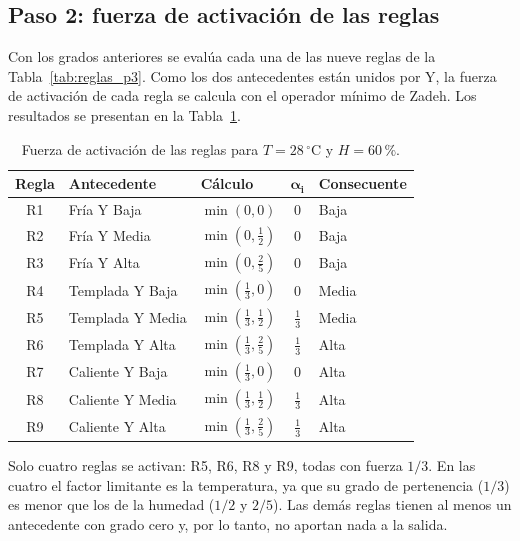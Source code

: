 \documentclass[11pt]{article}
\begin{document}
\subsection{Paso 2: fuerza de activación de las reglas}

Con los grados anteriores se evalúa cada una de las nueve reglas de la Tabla~\ref{tab:reglas_p3}. Como los dos antecedentes están unidos por Y, la fuerza de activación de cada regla se calcula con el operador mínimo de Zadeh. Los resultados se presentan en la Tabla~\ref{tab:activacion}.

\begin{table}[htbp]
\centering
\caption{Fuerza de activación de las reglas para $T = 28\,^\circ$C y $H = 60\,\%$.}
\label{tab:activacion}
\begin{tabular}{cllcl}
\toprule
\textbf{Regla} & \textbf{Antecedente} & \textbf{Cálculo} & $\boldsymbol{\alpha_i}$ & \textbf{Consecuente} \\
\midrule
R1 & Fría Y Baja         & $\min(0, 0)$                         & $0$           & Baja  \\
R2 & Fría Y Media        & $\min(0, \tfrac{1}{2})$              & $0$           & Baja  \\
R3 & Fría Y Alta         & $\min(0, \tfrac{2}{5})$              & $0$           & Baja  \\
R4 & Templada Y Baja     & $\min(\tfrac{1}{3}, 0)$              & $0$           & Media \\
R5 & Templada Y Media    & $\min(\tfrac{1}{3}, \tfrac{1}{2})$   & $\tfrac{1}{3}$ & Media \\
R6 & Templada Y Alta     & $\min(\tfrac{1}{3}, \tfrac{2}{5})$   & $\tfrac{1}{3}$ & Alta  \\
R7 & Caliente Y Baja     & $\min(\tfrac{1}{3}, 0)$              & $0$           & Alta  \\
R8 & Caliente Y Media    & $\min(\tfrac{1}{3}, \tfrac{1}{2})$   & $\tfrac{1}{3}$ & Alta  \\
R9 & Caliente Y Alta     & $\min(\tfrac{1}{3}, \tfrac{2}{5})$   & $\tfrac{1}{3}$ & Alta  \\
\bottomrule
\end{tabular}
\end{table}

Solo cuatro reglas se activan: R5, R6, R8 y R9, todas con fuerza $1/3$. En las cuatro el factor limitante es la temperatura, ya que su grado de pertenencia ($1/3$) es menor que los de la humedad ($1/2$ y $2/5$). Las demás reglas tienen al menos un antecedente con grado cero y, por lo tanto, no aportan nada a la salida.
\end{document}
